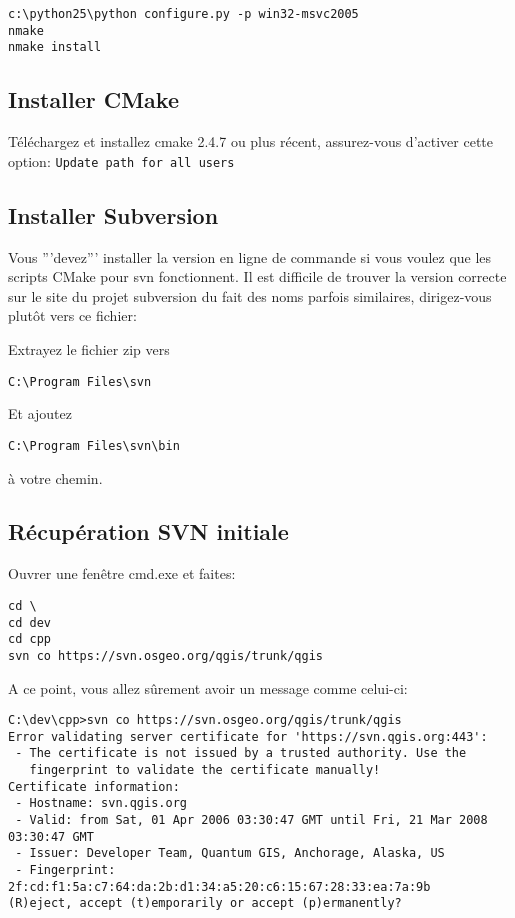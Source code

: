 \begin{verbatim}
c:\python25\python configure.py -p win32-msvc2005
nmake
nmake install
\end{verbatim}

\subsection{Installer CMake}
Téléchargez et installez cmake 2.4.7 ou plus récent, assurez-vous d'activer cette option:
\texttt{Update path for all users}

\subsection{Installer Subversion}
Vous '''devez''' installer la version en ligne de commande si vous voulez que les scripts CMake pour svn fonctionnent. Il est difficile de trouver la version correcte sur le site du projet subversion du fait des noms parfois similaires, dirigez-vous plutôt vers ce fichier:


Extrayez le fichier zip vers
\begin{verbatim}
C:\Program Files\svn
\end{verbatim}

Et ajoutez

\begin{verbatim}
C:\Program Files\svn\bin
\end{verbatim}

à votre chemin.

\subsection{Récupération SVN initiale}
Ouvrer une fenêtre cmd.exe et faites:

\begin{verbatim}
cd \
cd dev
cd cpp
svn co https://svn.osgeo.org/qgis/trunk/qgis 
\end{verbatim}

A ce point, vous allez sûrement avoir un message comme celui-ci:

\begin{verbatim}
C:\dev\cpp>svn co https://svn.osgeo.org/qgis/trunk/qgis
Error validating server certificate for 'https://svn.qgis.org:443':
 - The certificate is not issued by a trusted authority. Use the
   fingerprint to validate the certificate manually!
Certificate information:
 - Hostname: svn.qgis.org
 - Valid: from Sat, 01 Apr 2006 03:30:47 GMT until Fri, 21 Mar 2008 03:30:47 GMT
 - Issuer: Developer Team, Quantum GIS, Anchorage, Alaska, US
 - Fingerprint: 2f:cd:f1:5a:c7:64:da:2b:d1:34:a5:20:c6:15:67:28:33:ea:7a:9b
(R)eject, accept (t)emporarily or accept (p)ermanently?
\end{verbatim}

